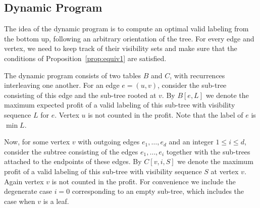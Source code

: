 \documentclass[11pt]{article}
\newcommand\+{\mkern2mu}
\begin{document}
\subsection{Dynamic Program}
The idea of the dynamic program is to compute an optimal valid labeling from the bottom up, following an arbitrary orientation of the tree. For every edge and vertex, we need to keep track of their visibility sets and make sure that the conditions of Proposition~\ref{prop:equiv1} are satisfied. 

The dynamic program consists of two tables $B$ and $C$, with recurrences interleaving one another. For an edge $e=(u,v)$, consider the sub-tree consisting of this edge and the sub-tree rooted at $v$. By $B[e,L]$ we denote the maximum expected profit of a valid labeling of this sub-tree with visibility sequence $L$ for $e$. Vertex $u$ is not counted in the profit. Note that the label of $e$ is $\min L$.

Now, for some vertex $v$ with outgoing edges $e_1, \ldots, e_d$ and an integer $1 \leq i \leq d$, consider the subtree consisting of the edges $e_1,\ldots,e_i$ together with the sub-trees attached to the endpoints of these edges. By $C[v,i,S]$ we denote the maximum profit of a valid labeling of this sub-tree with visibility sequence $S$ at vertex $v$. Again vertex $v$ is not counted in the profit. For convenience we include the degenerate case $i=0$ corresponding to an empty sub-tree, which includes the case when $v$ is a leaf.
\end{document}

